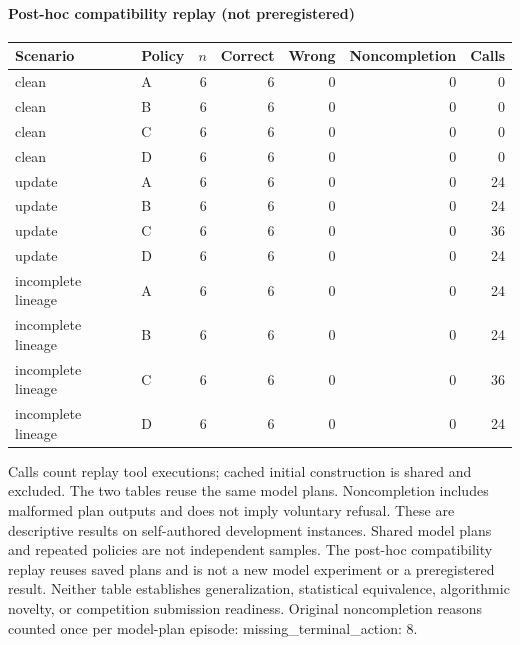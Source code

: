 \documentclass{article}
\begin{document}
\noindent\begin{minipage}{\linewidth}

\paragraph{Post-hoc compatibility replay (not preregistered)}

\begin{center}

{\footnotesize\setlength{\tabcolsep}{3pt}\begin{tabular}{llrrrrr}\hline

Scenario & Policy & $n$ & Correct & Wrong & Noncompletion & Calls \\\hline

clean & A & 6 & 6 & 0 & 0 & 0 \\

clean & B & 6 & 6 & 0 & 0 & 0 \\

clean & C & 6 & 6 & 0 & 0 & 0 \\

clean & D & 6 & 6 & 0 & 0 & 0 \\

update & A & 6 & 6 & 0 & 0 & 24 \\

update & B & 6 & 6 & 0 & 0 & 24 \\

update & C & 6 & 6 & 0 & 0 & 36 \\

update & D & 6 & 6 & 0 & 0 & 24 \\

incomplete lineage & A & 6 & 6 & 0 & 0 & 24 \\

incomplete lineage & B & 6 & 6 & 0 & 0 & 24 \\

incomplete lineage & C & 6 & 6 & 0 & 0 & 36 \\

incomplete lineage & D & 6 & 6 & 0 & 0 & 24 \\

\hline\end{tabular}}\end{center}\end{minipage}\par\medskip

Calls count replay tool executions; cached initial construction is shared and excluded. The two tables reuse the same model plans. Noncompletion includes malformed plan outputs and does not imply voluntary refusal. These are descriptive results on self-authored development instances. Shared model plans and repeated policies are not independent samples. The post-hoc compatibility replay reuses saved plans and is not a new model experiment or a preregistered result. Neither table establishes generalization, statistical equivalence, algorithmic novelty, or competition submission readiness. Original noncompletion reasons counted once per model-plan episode: missing\_terminal\_action: 8.
\end{document}
